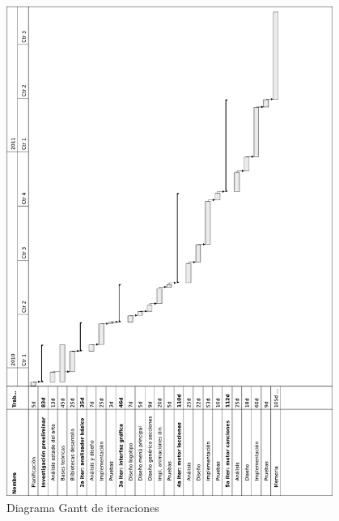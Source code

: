 \begin{figure}
  \centering
  \includegraphics[width=0.95\textwidth]{2_calendario/imagen_diagrama_gantt}
  \caption{Diagrama Gantt de iteraciones}
  \label{fig:gantt}
\end{figure}

